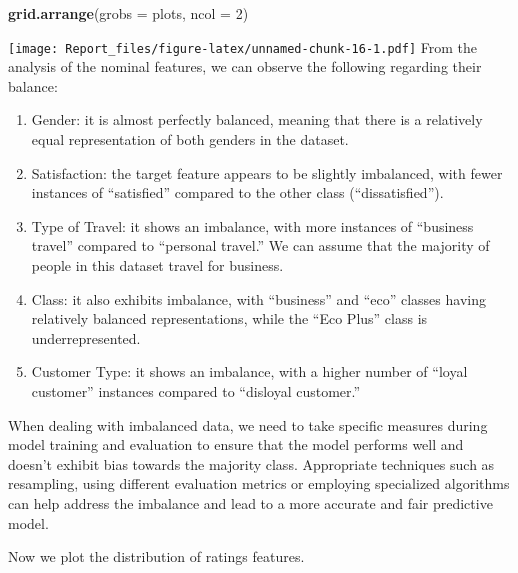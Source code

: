 \documentclass[
]{article}
\newenvironment{Shaded}{\begin{snugshade}}{\end{snugshade}}
\newcommand{\AttributeTok}[1]{\textcolor[rgb]{0.13,0.29,0.53}{#1}}
\newcommand{\DecValTok}[1]{\textcolor[rgb]{0.00,0.00,0.81}{#1}}
\newcommand{\FunctionTok}[1]{\textcolor[rgb]{0.13,0.29,0.53}{\textbf{#1}}}
\newcommand{\NormalTok}[1]{#1}
\begin{document}
\begin{Shaded}
\begin{Highlighting}[]
\FunctionTok{grid.arrange}\NormalTok{(}\AttributeTok{grobs =}\NormalTok{ plots, }\AttributeTok{ncol =} \DecValTok{2}\NormalTok{)}
\end{Highlighting}
\end{Shaded}

\texttt{[image: Report\_files/figure-latex/unnamed-chunk-16-1.pdf]} From
the analysis of the nominal features, we can observe the following
regarding their balance:

\begin{enumerate}
\def\labelenumi{\arabic{enumi}.}
\item
  Gender: it is almost perfectly balanced, meaning that there is a
  relatively equal representation of both genders in the dataset.
\item
  Satisfaction: the target feature appears to be slightly imbalanced,
  with fewer instances of ``satisfied'' compared to the other class
  (``dissatisfied'').
\item
  Type of Travel: it shows an imbalance, with more instances of
  ``business travel'' compared to ``personal travel.'' We can assume
  that the majority of people in this dataset travel for business.
\item
  Class: it also exhibits imbalance, with ``business'' and ``eco''
  classes having relatively balanced representations, while the ``Eco
  Plus'' class is underrepresented.
\item
  Customer Type: it shows an imbalance, with a higher number of ``loyal
  customer'' instances compared to ``disloyal customer.''
\end{enumerate}

When dealing with imbalanced data, we need to take specific measures
during model training and evaluation to ensure that the model performs
well and doesn't exhibit bias towards the majority class. Appropriate
techniques such as resampling, using different evaluation metrics or
employing specialized algorithms can help address the imbalance and lead
to a more accurate and fair predictive model.

Now we plot the distribution of ratings features.
\end{document}
